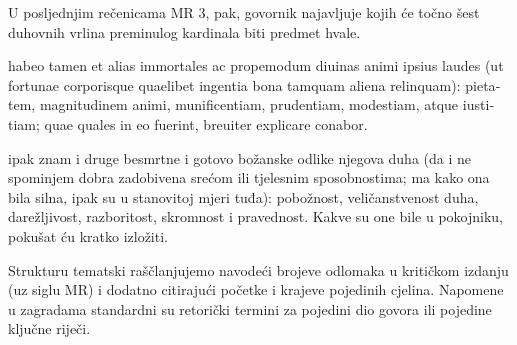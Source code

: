 \documentclass[a5paper,twoside]{article}
\renewenvironment{quote}
               {\list{}{\rightmargin 0mm
                \leftmargin 7mm
                \itemindent 0em}%
                \item\relax}
               {\endlist}
\begin{document}
U posljednjim rečenicama MR 3, pak, govornik najavljuje kojih će točno šest duhovnih vrlina preminulog kardinala biti predmet hvale.

\begin{quote}
\begin{latin}
habeo tamen et alias immortales ac propemodum diuinas animi ipsius laudes (ut fortunae corporisque quaelibet ingentia bona tamquam aliena relinquam): pietatem, magnitudinem animi, munificentiam, prudentiam, modestiam, atque iustitiam; quae quales in eo fuerint, breuiter explicare conabor.
\end{latin}

ipak znam i druge besmrtne i gotovo božanske odlike njegova duha (da i ne spominjem dobra zadobivena srećom ili tjelesnim sposobnostima; ma kako ona bila silna, ipak su u stanovitoj mjeri tuđa): pobožnost, veličanstvenost duha, darežljivost, razboritost, skromnost i pravednost.  Kakve su one bile u pokojniku, pokušat ću kratko izložiti.
\end{quote}

Strukturu tematski raščlanjujemo navodeći brojeve odlomaka u kritičkom izdanju (uz siglu MR) i dodatno citirajući početke i krajeve pojedinih cjelina. Napomene u zagradama standardni su retorički termini za pojedini dio govora ili pojedine ključne riječi.
\end{document}
